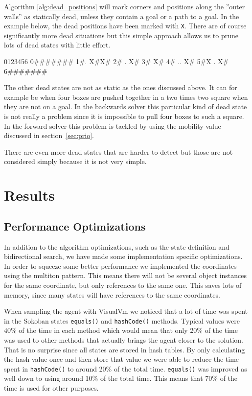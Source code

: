\documentclass[a4paper,11pt]{article}
\begin{document}
Algorithm \ref{alg:dead_positions} will mark corners and positions along the
''outer walls'' as statically dead, unless they contain a goal or a path to a goal.
In the example below, the dead positions have been marked with \verb!X!.
There are of course significantly more dead situations but this simple approach 
allows us to prune lots of dead states with little effort.

\begin{verbatimtab}
 0123456
0#######
1#. X#X#
2# .  X#
3#    X#
4# .. X#
5#X . X#
6#######

\end{verbatimtab}

The other dead states are not as static as the ones discussed above. 
It can for example be when four boxes are pushed together in a two times two square when they are not on a goal.
In the backwards solver this particular kind of dead state is not really a problem since it is
impossible to pull four boxes to such a square.
In the forward solver this problem is tackled by using the mobility value discussed in section~\ref{sec:prio}. 

There are even more dead states that are harder to detect but those are not considered simply because it is not very simple.

\section{Results}


\subsection{Performance Optimizations}
\label{sec:opt}
In addition to the algorithm optimizations, such as the state definition and bidirectional search,
we have made some implementation specific optimizations.
In order to squeeze some better performance we implemented
the coordinates using the multiton pattern.
This means there will not be several object instances for the same coordinate,
but only references to the same one.
This saves lots of memory, since many states will have references to the same coordinates.

When sampling the agent with VisualVm we noticed that a lot of time was spent in the Sokoban states \verb!equals()! and \verb!hashCode()! methods. 
Typical values were 40\% of the time in each method which would mean that only 20\% of the time was used to other methods that actually brings
the agent closer to the solution.
That is no surprise since all states are stored in hash tables. By only calculating the hash value once and then store that value
we were able to reduce the time spent in \verb!hashCode()! to around 20\% of the total time. \verb!equals()! was improved as well
down to using around 10\% of the total time. This means that 70\% of the time is used for other purposes.
\end{document}
